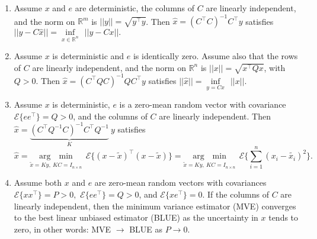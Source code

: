 \documentclass[letterpaper]{article}
\newcommand{\real}{\mathbb R}  %
\newcommand{\E}{\mathcal{E}}
\begin{document}
\begin{enumerate}
\begin{enumerate}
\setlength{\itemsep}{.3cm}
\renewcommand{\labelenumi}{(\alph{enumi})}
\item Assume $x$ and $e$ are deterministic, the columns of $C$ are linearly independent, and the norm on $\real^m$ is ${||y||=\sqrt{y^\top y}}$. Then $\widehat{x}= (C^\top C)^{-1} C^\top y$ satisfies $||y-C\widehat{x}||= \underset{x \in \real^n} \inf ~~ ||y-Cx||.$

    \item Assume $x$ is deterministic and $e$ is identically zero. Assume also that the rows of $C$ are linearly independent, and the norm on $\real^n$ is $||x||=\sqrt{x^\top Q x}$, with $Q >0$. Then $\widehat{x}= (C^\top QC)^{-1}Q C^\top y$ satisfies $||\widehat{x}||= \underset{y=Cx} \inf ~~ ||x||.$

  \item Assume $x$ is deterministic,  $e$ is a zero-mean random vector with covariance $\E\{e e^\top\}=Q >0$, and the columns of $C$ are linearly independent. Then $\widehat{x}= \underbrace{(C^\top Q^{-1}C)^{-1}C^\top Q^{-1}}_{K}~y$ satisfies
      $$\widehat{x}=  \underset{ \tilde{x}=Ky,~KC=I_{n \times n} }{\arg~~\min} ~~\E \{(x-\tilde{x})^\top (x - \tilde{x}) \} =  \underset{ \tilde{x}=Ky,~KC=I_{n \times n} }{\arg~~\min}  ~~\E\{ \sum \limits_{i=1}^n \left(x_i-\tilde{x_i}\right)^2\} .$$

       \item Assume both $x$ and $e$ are zero-mean random vectors with covariances $\E\{x x^\top\}=P>0, $ $\E\{e e^\top\}=Q >0$, and $\E\{x e^\top\}=0$.  If the columns of $C$ are linearly independent, then the minimum variance estimator (MVE) converges to the best linear unbiased estimator (BLUE)  as the uncertainty in $x$ tends to zero, in other words: MVE $\to$ BLUE as $P \to 0$.

\end{enumerate}






\end{enumerate}
\end{document}
